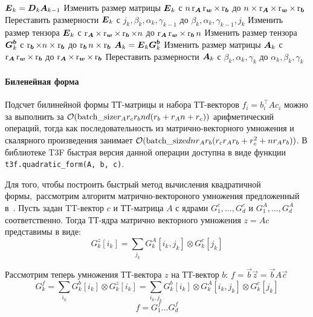 \begin{algorithm}[tb]
\begin{algorithmic}[1]
   \STATE $\boldsymbol{E}_k = \boldsymbol{D}_k \boldsymbol{A}_{k-1}$ 
   \STATE Изменить размер матрицы $\boldsymbol{E}_k$ с $n \operatorname{r}_{\boldsymbol{A}} \operatorname{r}_{\boldsymbol{w}} \times \operatorname{r}_{\boldsymbol{b}}$ до $n \times \operatorname{r}_{\boldsymbol{A}} \times \operatorname{r}_{\boldsymbol{w}} \times \operatorname{r}_{\boldsymbol{b}}$
   \STATE Переставить размерности $\boldsymbol{E}_k$ с $j_k, \beta_{k}, \alpha_{k}, \gamma_{k-1}$ до $\beta_{k}, \alpha_{k}, \gamma_{k-1}, j_k$
   \STATE Изменить размер тензора $\boldsymbol{E}_k$ с $\operatorname{r}_{\boldsymbol{A}} \times \operatorname{r}_{\boldsymbol{w}}\times \operatorname{r}_{\boldsymbol{b}} \times n$ до $\operatorname{r}_{\boldsymbol{A}} \operatorname{r}_{\boldsymbol{w}} \times \operatorname{r}_{\boldsymbol{b}} n$
   \STATE Изменить размер тензора $\boldsymbol{G}_k^{\boldsymbol{b}}$ с $\operatorname{r}_{\boldsymbol{b}} \times n \times \operatorname{r}_{\boldsymbol{b}}$ до $\operatorname{r}_{\boldsymbol{b}} n \times \operatorname{r}_{\boldsymbol{b}}$
   \STATE $\boldsymbol{A}_k = \boldsymbol{E}_k \boldsymbol{G}_k^{\boldsymbol{b}}$ 
   \STATE Изменить размер матрицы $\boldsymbol{A}_k$ с $\operatorname{r}_{\boldsymbol{A}} \operatorname{r}_{\boldsymbol{w}} \times \operatorname{r}_{\boldsymbol{b}}$ до $\operatorname{r}_{\boldsymbol{A}} \times \operatorname{r}_{\boldsymbol{w}} \times \operatorname{r}_{\boldsymbol{b}}$
   \STATE Переставить размерности $\boldsymbol{A}_k$ с $\beta_k, \alpha_k, \gamma_k$ до $\alpha_k, \beta_k, \gamma_k$
   \ENDFOR
\end{algorithmic}
\end{algorithm}



\paragraph{Биленейная форма}
Подсчет билинейной формы ТТ-матрицы и набора ТТ-векторов $f_{i} = b_i^\intercal A c_i$ можно за выполнить за $\mathcal{O}(\text{batch\_size} r_A r_c r_b n d (r_b + r_A n + r_c))$ арифметический операций, тогда как последовательность из матрично-векторного умножения и скалярного произведения занимает $\mathcal{O}(\text{batch\_size} d n r_A r_b (r_c r_A r_b + r_c^2 + n r_A r_b))$. В библиотеке T3F быстрая версия данной операции доступна в виде функции \texttt{t3f.quadratic\_form(A, b, c)}.

Для того, чтобы построить быстрый метод вычисления квадратичной формы, рассмотрим алгоритм матрично-вектороного умножения предложенный в~\cite{oseledets2011ttMain}. Пусть задан TT-вектор $c$ и ТТ-матрица $A$ с ядрами $G_1^c, \ldots, G_d^c$ и $G_1^A, \ldots, G_d^A$ соответственно. Тогда ТТ-ядра матрично векторного умножения $z = Ac$ представимы в виде:
\[
G_k^z[i_k] = \sum_{j_k} G_k^A[i_k, j_k] \otimes G_k^c[j_k]
\]

Рассмотрим теперь умножения ТТ-вектора $z$ на ТТ-вектор $b$: $f = \vec{b}\vec{z} = \vec{b}A \vec{c}$
\[
G_k^f = \sum_{i_k} G_k^b[i_k] \otimes G_k^z[i_k] = \sum_{i_k, j_k} G_k^b[i_k] \otimes G_k^A[i_k, j_k] \otimes G_k^c[j_k]
\]
\[
f = G_1^f \ldots G_d^f
\]

